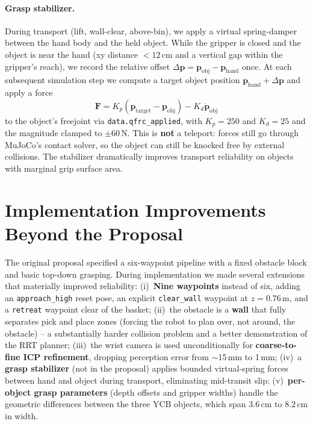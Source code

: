 \documentclass[11pt]{article}
\begin{document}
\paragraph{Grasp stabilizer.}
During transport (lift, wall-clear, above-bin), we apply a virtual
spring-damper between the hand body and the held object. While the
gripper is closed and the object is near the hand (xy distance $< 12$\,cm
and a vertical gap within the gripper's reach), we record the relative
offset $\Delta\mathbf{p} = \mathbf{p}_{\text{obj}} -
\mathbf{p}_{\text{hand}}$ once. At each subsequent simulation step we
compute a target object position $\mathbf{p}_{\text{hand}} + \Delta
\mathbf{p}$ and apply a force
\[
\mathbf{F} = K_p (\mathbf{p}_{\text{target}} - \mathbf{p}_{\text{obj}})
- K_d \dot{\mathbf{p}}_{\text{obj}}
\]
to the object's freejoint via \texttt{data.qfrc\_applied}, with $K_p =
250$ and $K_d = 25$ and the magnitude clamped to $\pm 60$\,N. This is
\textbf{not} a teleport: forces still go through MuJoCo's contact solver,
so the object can still be knocked free by external collisions. The
stabilizer dramatically improves transport reliability on objects with
marginal grip surface area.

\section{Implementation Improvements Beyond the Proposal}

The original proposal specified a six-waypoint pipeline with a fixed
obstacle block and basic top-down grasping. During implementation we
made several extensions that materially improved reliability:
(i)~\textbf{Nine waypoints} instead of six, adding an
\texttt{approach\_high} reset pose, an explicit \texttt{clear\_wall}
waypoint at $z = 0.76$\,m, and a \texttt{retreat} waypoint clear of the
basket; (ii)~the obstacle is a \textbf{wall} that fully separates pick
and place zones (forcing the robot to plan over, not around, the
obstacle) -- a substantially harder collision problem and a better
demonstration of the RRT planner; (iii)~the wrist camera is used
unconditionally for \textbf{coarse-to-fine ICP refinement}, dropping
perception error from $\sim$15\,mm to 1\,mm; (iv)~a \textbf{grasp
stabilizer} (not in the proposal) applies bounded virtual-spring forces
between hand and object during transport, eliminating mid-transit slip;
(v)~\textbf{per-object grasp parameters} (depth offsets and gripper
widths) handle the geometric differences between the three YCB
objects, which span 3.6\,cm to 8.2\,cm in width.
\end{document}
